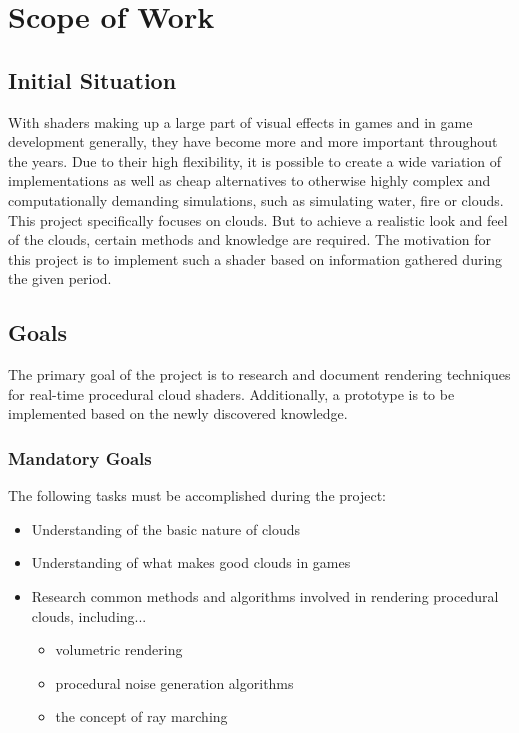 \section{Scope of Work}

\subsection{Initial Situation}
With shaders making up a large part of visual effects in games and in game development generally, they have become more and more important throughout the years. Due to their high flexibility, it is possible to create a wide variation of implementations as well as cheap alternatives to otherwise highly complex and computationally demanding simulations, such as simulating water, fire or clouds.
\\ This project specifically focuses on clouds. But to achieve a realistic look and feel of the clouds, certain methods and knowledge are required. The motivation for this project is to implement such a shader based on information gathered during the given period.


\subsection{Goals}
\label{section:goals}
The primary goal of the project is to research and document rendering techniques for real-time procedural cloud shaders. Additionally, a prototype is to be implemented based on the newly discovered knowledge.

\subsubsection{Mandatory Goals}
The following tasks must be accomplished during the project:
\begin{itemize}
\item Understanding of the basic nature of clouds
\item Understanding of what makes good clouds in games
\item Research common methods and algorithms involved in rendering procedural clouds, including...
    \begin{itemize}
    \item volumetric rendering
    \item procedural noise generation algorithms
    \item the concept of ray marching
    \end{itemize}
\end{itemize}

